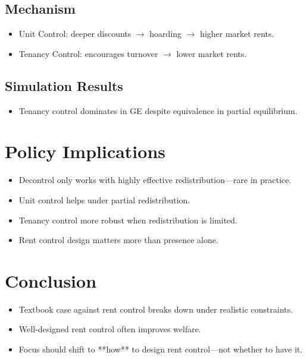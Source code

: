 \documentclass[11pt]{article}
\begin{document}
\subsection{Mechanism}
\begin{itemize}[leftmargin=*]
    \item Unit Control: deeper discounts $\rightarrow$ hoarding $\rightarrow$ higher market rents.
    \item Tenancy Control: encourages turnover $\rightarrow$ lower market rents.
\end{itemize}

\subsection{Simulation Results}
\begin{itemize}[leftmargin=*]
    \item Tenancy control dominates in GE despite equivalence in partial equilibrium.
\end{itemize}

\section{Policy Implications}
\begin{itemize}[leftmargin=*]
    \item Decontrol only works with highly effective redistribution—rare in practice.
    \item Unit control helps under partial redistribution.
    \item Tenancy control more robust when redistribution is limited.
    \item Rent control design matters more than presence alone.
\end{itemize}

\section{Conclusion}
\begin{itemize}[leftmargin=*]
    \item Textbook case against rent control breaks down under realistic constraints.
    \item Well-designed rent control often improves welfare.
    \item Focus should shift to **how** to design rent control—not whether to have it.
\end{itemize}
\end{document}

